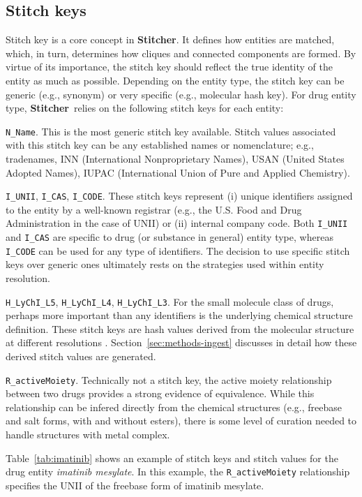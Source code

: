 \documentclass{bioinfo}
\newcommand\st{\textbf{Stitcher}}
\begin{document}
\subsection{Stitch keys}
Stitch key is a core concept in \st. It defines how entities are matched, which, in turn, determines how cliques and connected components are formed. By virtue of its importance, the stitch key should reflect the true identity of the entity as much as possible. Depending on the entity type, the stitch key can be generic (e.g., synonym) or very specific (e.g., molecular hash key). For drug entity type, \st\ relies on the following stitch keys for each entity:
\begin{unlist}
\item{\texttt{N\_Name}.} This is the most generic stitch key available. Stitch values associated with this stitch key can be any established names or nomenclature; e.g., tradenames, INN (International Nonproprietary Names), USAN (United States Adopted Names), IUPAC (International Union of Pure and Applied Chemistry).
\item{\texttt{I\_UNII}, \texttt{I\_CAS}, \texttt{I\_CODE}.} These stitch keys represent (i) unique identifiers assigned to the entity by a well-known registrar (e.g., the U.S. Food and Drug Administration in the case of UNII) or (ii) internal company code. Both \texttt{I\_UNII} and \texttt{I\_CAS} are specific to drug (or substance in general) entity type, whereas \texttt{I\_CODE} can be used for any type of identifiers. The decision to use specific stitch keys over generic ones ultimately rests on the strategies used within entity resolution.
\item{\texttt{H\_LyChI\_L5}, \texttt{H\_LyChI\_L4}, \texttt{H\_LyChI\_L3}.} For the small molecule class of drugs, perhaps more important than any identifiers is the underlying chemical structure definition. These stitch keys are hash values derived from the molecular structure at different resolutions \citep{lychi}. Section~\ref{sec:methods-ingest} discusses in detail how these derived stitch values are generated.
\item{\texttt{R\_activeMoiety}.} Technically not a stitch key, the active moiety relationship between two drugs provides a strong evidence of equivalence. While this relationship can be infered directly from the chemical structures (e.g., freebase and salt forms, with and without esters), there is some level of curation needed to handle structures with metal complex.
\end{unlist}
Table~\ref{tab:imatinib} shows an example of stitch keys and stitch values for
the drug entity \emph{imatinib mesylate}. In this example, the \texttt{R\_activeMoiety} relationship specifies the UNII of the freebase form of imatinib mesylate.
\end{document}
